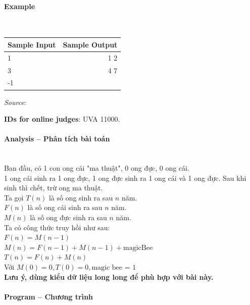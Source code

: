 \documentclass{article}
\begin{document}
\paragraph{Example}\mbox{} \\

\begin{table}[h]
    \centering
    \begin{tabular}{|l|r|}
        \hline
        \textbf{Sample Input} & \textbf{Sample Output} \\
        \hline
        1   & 1 2   \\ 
        3   & 4 7  \\  
        -1  &  \\ \hline
    \end{tabular}
\end{table}

\textit{Source}: 

\textbf{IDs for online judges}: UVA 11000.


\paragraph{Analysis -- Phân tích bài toán} \mbox{} \\

Ban đầu, có 1 con ong cái "ma thuật", 0 ong đực, 0 ong cái.\\

1 ong cái sinh ra 1 ong đực, 1 ong đực sinh ra 1 ong cái và 1 ong đực. Sau khi sinh thì chết, trừ ong ma thuật.\\

Ta gọi $T(n)$ là số ong sinh ra sau $n$ năm.\\
$F(n)$ là số ong cái sinh ra sau $n$ năm.\\
$M(n)$ là số ong đực sinh ra sau $n$ năm.\\

Ta có công thức truy hồi như sau: \\

$F(n) = M(n - 1)$\\
$M(n) = F(n - 1) + M(n - 1) + \text{magicBee}$\\
$T(n) = F(n) + M(n)$ \\

Với $M(0) = 0, T(0) = 0, \text{magic bee = 1}$\\

\textbf{Lưu ý, dùng kiểu dữ liệu long long để phù hợp với bài này.}


\paragraph{Program -- Chương trình} \mbox{} \\
\end{document}
